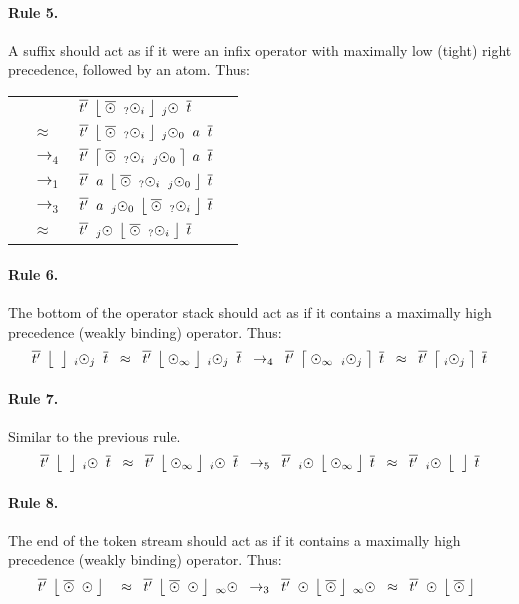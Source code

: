 \documentclass{article}
\makeatletter
\newenvironment{Table}
  {\begin{center}\begin{tabular}{l l l @{\quad}l}}
  {\end{tabular}\end{center}}
\makeatother
\begin{document}
\paragraph{Rule 5.} A suffix should act as if it were an infix operator with maximally low (tight)
right precedence, followed by an atom. Thus:
\begin{Table}
&&          $\overline{t'} \;\, \big\lfloor\; \overline{{\odot}}\;\;{}_{?}{\odot}_{i} \;\big\rfloor \;\, {}_{j}{\odot}\;\;\overline{t}$ \\
&$\approx$& $\overline{t'} \;\, \big\lfloor\; \overline{{\odot}}\;\;{}_{?}{\odot}_{i} \;\big\rfloor \;\, {}_{j}{\odot}_{0}\;\;{a}\;\;\overline{t}$ \\
&$\to_4$&   $\overline{t'} \;\, \big\lceil\; \overline{{\odot}}\;\;{}_{?}{\odot}_{i}\;\;{}_{j}{\odot}_{0} \;\big\rceil \;\, {a}\;\;\overline{t}$ \\
&$\to_1$&   $\overline{t'}\;\;{a} \;\, \big\lfloor\; \overline{{\odot}}\;\;{}_{?}{\odot}_{i}\;\;{}_{j}{\odot}_{0} \;\big\rfloor \;\, \overline{t}$ \\
&$\to_3$&   $\overline{t'}\;\;{a}\;\;{}_{j}{\odot}_{0} \;\, \big\lfloor\; \overline{{\odot}}\;\;{}_{?}{\odot}_{i} \;\big\rfloor \;\, \overline{t}$ \\
&$\approx$& $\overline{t'}\;\;{}_{j}{\odot} \;\, \big\lfloor\; \overline{{\odot}}\;\;{}_{?}{\odot}_{i} \;\big\rfloor \;\, \overline{t}$
\end{Table}

\paragraph{Rule 6.} The bottom of the operator stack should act as if it contains a maximally high
precedence (weakly binding) operator. Thus:
\[
\overline{t'} \;\, \big\lfloor\;  \;\big\rfloor \;\, {}_{i}{\odot}_{j}\;\;\overline{t}
\;\;\approx\;\;
\overline{t'} \;\, \big\lfloor\; {\odot}_{\infty} \;\big\rfloor \;\, {}_{i}{\odot}_{j}\;\;\overline{t}
\;\;\to_4\;\;
\overline{t'} \;\, \big\lceil\; {\odot}_{\infty}\;\;{}_{i}{\odot}_{j} \;\big\rceil \;\, \overline{t}
\;\;\approx\;\;
\overline{t'} \;\, \big\lceil\; {}_{i}{\odot}_{j} \;\big\rceil \;\, \overline{t}
\]
\paragraph{Rule 7.} Similar to the previous rule.
\[
\overline{t'} \;\, \big\lfloor\;  \;\big\rfloor \;\, {}_{i}{\odot}\;\;\overline{t}
\;\;\approx\;\;
\overline{t'} \;\, \big\lfloor\; {\odot}_{\infty} \;\big\rfloor \;\, {}_{i}{\odot}\;\;\overline{t}
\;\;\to_5\;\;
\overline{t'}\;\;{}_{i}{\odot} \;\, \big\lfloor\; {\odot}_{\infty} \;\big\rfloor \;\, \overline{t}
\;\;\approx\;\;
\overline{t'}\;\;{}_{i}{\odot} \;\, \big\lfloor\;  \;\big\rfloor \;\, \overline{t}
\]
\paragraph{Rule 8.} The end of the token stream should act as if it contains a maximally high
precedence (weakly binding) operator. Thus:
\[
\overline{t'} \;\, \big\lfloor\; \overline{{\odot}}\;\;{\odot} \;\big\rfloor \;\,
\;\;\approx\;\;
\overline{t'} \;\, \big\lfloor\; \overline{{\odot}}\;\;{\odot} \;\big\rfloor \;\, {}_{\infty}{\odot}
\;\;\to_3\;\;
\overline{t'}\;\;{\odot} \;\, \big\lfloor\; \overline{{\odot}} \;\big\rfloor \;\, {}_{\infty}{\odot}
\;\;\approx\;\;
\overline{t'}\;\;{\odot} \;\, \big\lfloor\; \overline{{\odot}} \;\big\rfloor \;\,
\]
\end{document}
